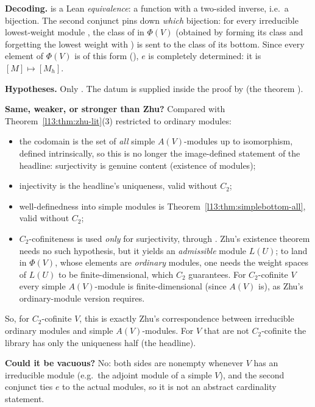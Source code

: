 \begin{dictionary}
\textbf{Decoding.}  is a Lean \emph{equivalence}: a function with a two-sided inverse,
i.e.\ a bijection. The second conjunct pins down \emph{which} bijection: for every irreducible lowest-weight module , the
class of  in $\Phi(V)$ (obtained by forming its class  and forgetting the
lowest weight with ) is sent to the class of its bottom. Since every element of $\Phi(V)$ is of this form
(), $e$ is completely determined: it is $[M]\mapsto[M_h]$.

\textbf{Hypotheses.} Only . The datum  is supplied inside the proof by
 (the theorem ).

\textbf{Same, weaker, or stronger than Zhu?} Compared with Theorem~\ref{l13:thm:zhu-lit}(3) restricted to ordinary modules:
\begin{itemize}
\item the codomain is the set of \emph{all} simple $A(V)$-modules up to isomorphism, defined intrinsically, so this is no longer the
  image-defined statement of the headline: surjectivity is genuine content (existence of modules);
\item injectivity is the headline's uniqueness, valid without $C_2$;
\item well-definedness into simple modules is Theorem~\ref{l13:thm:simplebottom-all}, valid without $C_2$;
\item $C_2$-cofiniteness is used \emph{only} for surjectivity, through . Zhu's existence
  theorem needs no such hypothesis, but it yields an \emph{admissible} module $L(U)$; to land in $\Phi(V)$, whose elements are
  \emph{ordinary} modules, one needs the weight spaces of $L(U)$ to be finite-dimensional, which $C_2$ guarantees. For
  $C_2$-cofinite $V$ every simple $A(V)$-module is finite-dimensional (since $A(V)$ is), as Zhu's ordinary-module version
  requires.
\end{itemize}
So, for $C_2$-cofinite $V$, this is exactly Zhu's correspondence between irreducible ordinary modules and simple
$A(V)$-modules. For $V$ that are not $C_2$-cofinite the library has only the uniqueness half (the headline).

\textbf{Could it be vacuous?} No: both sides are nonempty whenever $V$ has an irreducible module (e.g.\ the adjoint module of a
simple $V$), and the second conjunct ties $e$ to the actual modules, so it is not an abstract cardinality statement.
\end{dictionary}

